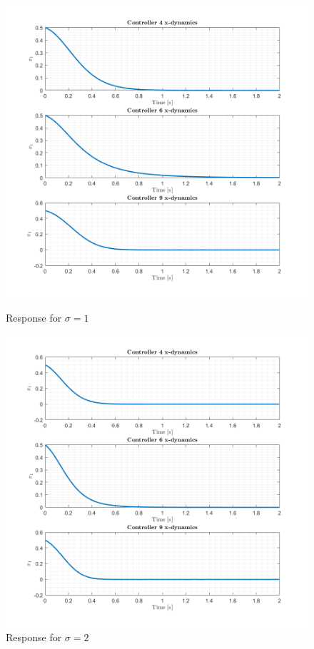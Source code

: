 \documentclass[a4paper,12pt]{article}
\begin{document}
\begin{figure}[H]
\centering
\begin{minipage}{.5\textwidth}
  \centering
  \includegraphics[width=\linewidth]{Figures/sigma_1.png}
  \caption{Response for $\sigma = 1$}
  \label{fig:sigma1}
\end{minipage}%
\begin{minipage}{.5\textwidth}
  \centering
 \includegraphics[width=\linewidth]{Figures/sigma_2.png}
  \caption{Response for $\sigma = 2$}
  \label{fig:sigma2}
\end{minipage}
\end{figure}
\end{document}
